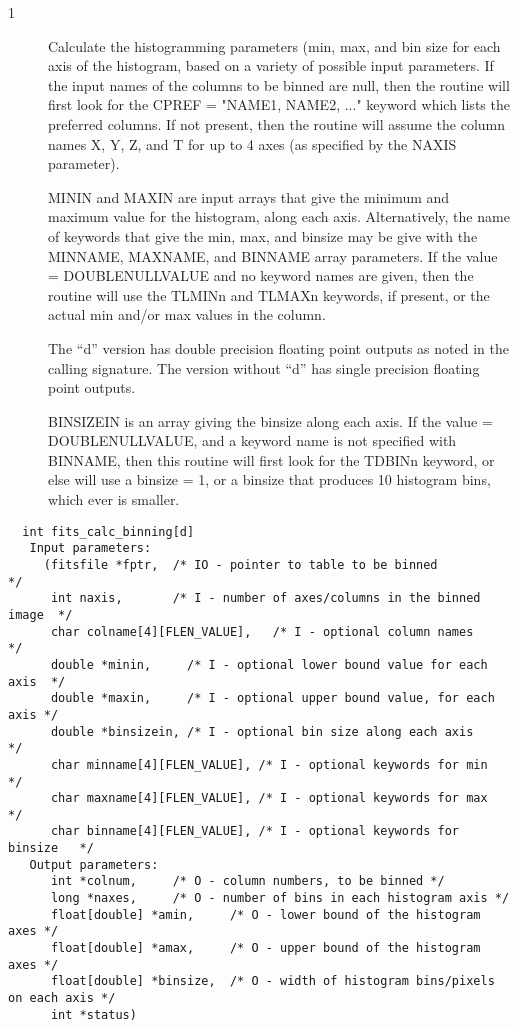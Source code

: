 \documentclass[11pt]{book}
\begin{document}
\begin{description}
\item[1 ]  Calculate the histogramming parameters (min, max, and bin size
for each axis of the histogram, based on a variety of possible input parameters.
If the input names of the columns to be binned are null, then the routine will first
look for the CPREF = "NAME1, NAME2, ..." keyword which lists the preferred
columns.  If not present, then the routine will assume the column names X, Y, Z, and T
for up to 4 axes (as specified by the NAXIS parameter).

MININ and MAXIN are input arrays that give the minimum and maximum value for
the histogram, along each axis.  Alternatively, the name of keywords that give
the min, max, and binsize may be give with the MINNAME, MAXNAME, and BINNAME
array parameters.  If the value = DOUBLENULLVALUE and no keyword names are
given,  then the routine will use the TLMINn and TLMAXn keywords, if present, or the
actual min and/or max values in the column.

The ``d'' version has double precision floating point outputs as noted
in the calling signature.  The version without ``d'' has single
precision floating point outputs.

BINSIZEIN is an array giving the binsize along each axis.
If the value =
DOUBLENULLVALUE, and a keyword name is not specified with BINNAME,
then this routine will first look for the TDBINn keyword, or else will
use a binsize = 1, or a binsize that produces 10 histogram bins, which ever
is smaller.
 \label{calcbinning}
\end{description}

\begin{verbatim}
  int fits_calc_binning[d]
   Input parameters:
     (fitsfile *fptr,  /* IO - pointer to table to be binned              */
      int naxis,       /* I - number of axes/columns in the binned image  */
      char colname[4][FLEN_VALUE],   /* I - optional column names         */
      double *minin,     /* I - optional lower bound value for each axis  */
      double *maxin,     /* I - optional upper bound value, for each axis */
      double *binsizein, /* I - optional bin size along each axis         */
      char minname[4][FLEN_VALUE], /* I - optional keywords for min       */
      char maxname[4][FLEN_VALUE], /* I - optional keywords for max       */
      char binname[4][FLEN_VALUE], /* I - optional keywords for binsize   */
   Output parameters:
      int *colnum,     /* O - column numbers, to be binned */
      long *naxes,     /* O - number of bins in each histogram axis */
      float[double] *amin,     /* O - lower bound of the histogram axes */
      float[double] *amax,     /* O - upper bound of the histogram axes */
      float[double] *binsize,  /* O - width of histogram bins/pixels on each axis */
      int *status)
\end{verbatim}
\end{document}
